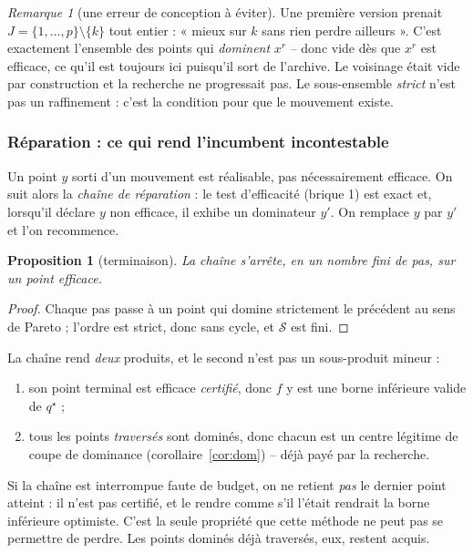 \documentclass[11pt,a4paper]{article}
\theoremstyle{plain}
\newtheorem{proposition}[theorem]{Proposition}
\theoremstyle{remark}
\newtheorem{remark}{Remarque}
\newcommand{\Scal}{\mathcal{S}}
\newcommand{\qs}{q^{\star}}
\begin{document}
\begin{remark}[une erreur de conception à éviter]
Une première version prenait $J=\{1,\dots,p\}\setminus\{k\}$ tout entier :
« mieux sur $k$ sans rien perdre ailleurs ». C'est exactement l'ensemble des
points qui \emph{dominent} $x^r$ -- donc vide dès que $x^r$ est efficace, ce
qu'il est toujours ici puisqu'il sort de l'archive. Le voisinage était vide
par construction et la recherche ne progressait pas. Le sous-ensemble
\emph{strict} n'est pas un raffinement : c'est la condition pour que le
mouvement existe.
\end{remark}

\subsubsection*{Réparation : ce qui rend l'incumbent incontestable}

Un point $y$ sorti d'un mouvement est réalisable, pas nécessairement
efficace. On suit alors la \emph{chaîne de réparation} : le test
d'efficacité (brique 1) est exact et, lorsqu'il déclare $y$ non efficace,
il exhibe un dominateur $y'$. On remplace $y$ par $y'$ et l'on
recommence.

\begin{proposition}[terminaison]
La chaîne s'arrête, en un nombre fini de pas, sur un point efficace.
\end{proposition}
\begin{proof}
Chaque pas passe à un point qui domine strictement le précédent au sens de
Pareto ; l'ordre est strict, donc sans cycle, et $\Scal$ est fini.
\end{proof}

La chaîne rend \emph{deux} produits, et le second n'est pas un sous-produit
mineur :
\begin{enumerate}
\item son point terminal est efficace \emph{certifié}, donc
  $f$ y est une borne inférieure valide de $\qs$ ;
\item tous les points \emph{traversés} sont dominés, donc chacun est un
  centre légitime de coupe de dominance (corollaire~\ref{cor:dom}) --
  déjà payé par la
  recherche.
\end{enumerate}
Si la chaîne est interrompue faute de budget, on ne retient \emph{pas} le
dernier point atteint : il n'est pas certifié, et le rendre comme s'il
l'était rendrait la borne inférieure optimiste. C'est la seule propriété
que cette méthode ne peut pas se permettre de perdre. Les points dominés
déjà traversés, eux, restent acquis.
\end{document}
